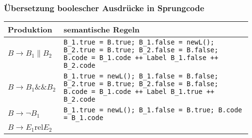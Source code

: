 \subsubsection{Übersetzung boolescher Ausdrücke in Sprungcode}
\begin{center}
 \begin{tabular}{l|p{12.5cm}}
\textbf{Produktion}   & \textbf{semantische Regeln} \\\hline
$B \to B_1 \| B_2$    & \lstinline$B_1.true = B.true; B_1.false = newL();$\newline
                        \lstinline$B_2.true = B.true; B_2.false = B.false;$\newline
                        \lstinline$B.code = B_1.code ++ Label B_1.false ++ B_2.code$ \\\hline
$B \to B_1 \&\& B_2$  & \lstinline$B_1.true = newL(); B_1.false = B.false;$\newline
                        \lstinline$B_2.true = B.true; B_2.false = B.false;$\newline
                        \lstinline$B.code = B_1.code ++ Label B_1.true ++ B_2.code$ \\\hline
$B \to \neg B_1$      & \lstinline$B_1.true = newL(); B_1.false = B.true; B.code = B_1.code$\\
$B \to E_1 \text{rel} E_2$ &
 \end{tabular}

\end{center}


